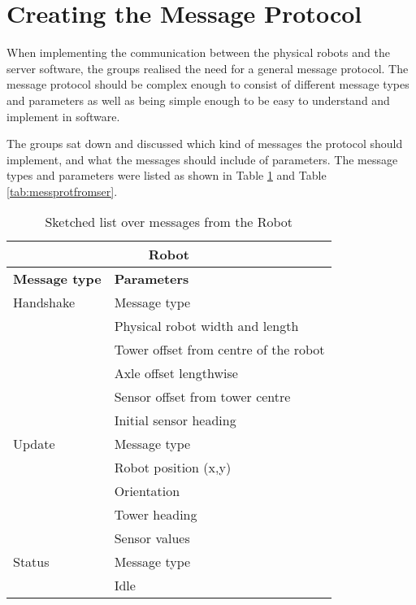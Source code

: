 \section{Creating the Message Protocol}
\label{sec:cremessprot}
When implementing the communication between the physical robots and the server software, the groups realised the need for a general message protocol. The message protocol should be complex enough to consist of different message types and parameters as well as being simple enough to be easy to understand and implement in software. 

The groups sat down and discussed which kind of messages the protocol should implement, and what the messages should include of parameters. The message types and parameters were listed as shown in Table \ref{tab:messprotfromrob} and Table \ref{tab:messprotfromser}.

\begin{table}[ht]
\begin{center}
 \begin{tabular}{|p{60pt} | p{150pt}|}
 \hline
 \multicolumn{2}{|c|}{\textbf{Robot}}\\
 \hline
 \hline
 \textbf{Message type}       &    \textbf{Parameters} \\
 \hline

 Handshake          &   Message type \\
                     &    Physical robot width and length  \\
                    &   Tower offset from centre of the robot\\
                    &    Axle offset lengthwise \\
                    &    Sensor offset from tower centre \\
                    &    Initial sensor heading \\
 \hline
 Update              &   Message type \\
                    &   Robot position (x,y) \\
                    &   Orientation \\
                    &   Tower heading \\
                    &    Sensor values \\
 \hline
 Status                &   Message type \\
                     &    Idle\\
 \hline
 \end{tabular}
\end{center}
\caption{Sketched list over messages from the Robot}
\label{tab:messprotfromrob}
\end{table}


